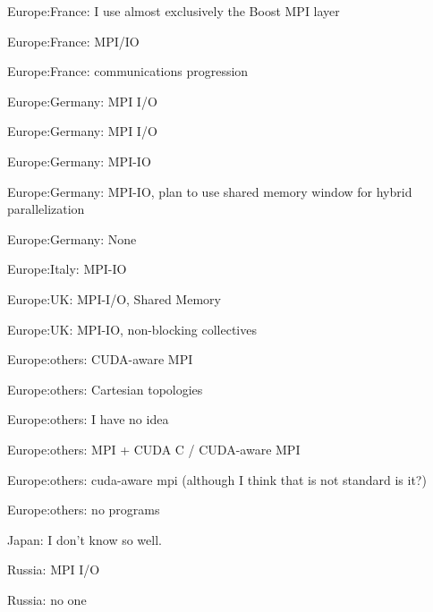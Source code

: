 \item Europe:France: I use almost exclusively the Boost MPI layer
\item Europe:France: MPI/IO
\item Europe:France: communications progression
\item Europe:Germany: MPI I/O
\item Europe:Germany: MPI I/O
\item Europe:Germany: MPI-IO
\item Europe:Germany: MPI-IO, plan to use shared memory window for hybrid parallelization
\item Europe:Germany: None
\item Europe:Italy: MPI-IO
\item Europe:UK: MPI-I/O, Shared Memory
\item Europe:UK: MPI-IO, non-blocking collectives
\item Europe:others: CUDA-aware MPI
\item Europe:others: Cartesian topologies
\item Europe:others: I have no idea
\item Europe:others: MPI + CUDA C / CUDA-aware MPI
\item Europe:others: cuda-aware mpi (although I think that is not standard is it?)
\item Europe:others: no programs
\item Japan: I don't know so well.
\item Russia: MPI I/O
\item Russia: no one
